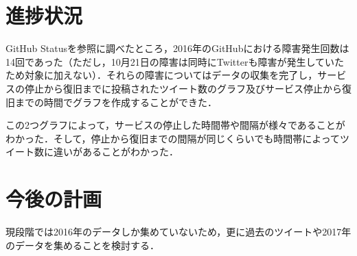 \documentclass[uplatex,twocolumn,dvipdfmx]{jsarticle}
\begin{document}
\section{進捗状況}
GitHub Statusを参照に調べたところ，2016年のGitHubにおける障害発生回数は14回であった（ただし，10月21日の障害は同時にTwitterも障害が発生していたため対象に加えない）．それらの障害についてはデータの収集を完了し，サービスの停止から復旧までに投稿されたツイート数のグラフ及びサービス停止から復旧までの時間でグラフを作成することができた．

この2つグラフによって，サービスの停止した時間帯や間隔が様々であることがわかった．そして，停止から復旧までの間隔が同じくらいでも時間帯によってツイート数に違いがあることがわかった．
\section{今後の計画}
現段階では2016年のデータしか集めていないため，更に過去のツイートや2017年のデータを集めることを検討する．

\end{document}
